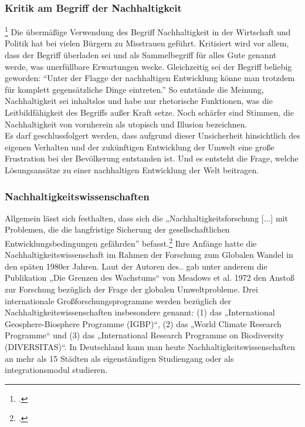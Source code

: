 \documentclass{scrartcl}
\begin{document}
\subsubsection{Kritik am Begriff der Nachhaltigkeit}\footcite{NachhaltigeBrockhaus.de}
Die übermäßige Verwendung des Begriff Nachhaltigkeit in der Wirtschaft und Politik hat bei vielen Bürgern zu Misstrauen geführt. Kritisiert wird vor allem, dass der Begriff überladen sei und als Sammelbegriff für alles Gute genannt werde, was unerfüllbare Erwartungen wecke. Gleichzeitig sei der Begriff beliebig geworden: “Unter der Flagge der nachhaltigen Entwicklung könne man trotzdem für komplett gegensätzliche Dinge eintreten.” So entstände die Meinung, Nachhaltigkeit sei inhaltslos und habe nur rhetorische Funktionen, was die Leitbildfähigkeit des Begriffs außer Kraft setze. Noch schärfer sind Stimmen, die Nachhaltigkeit von vornherein als utopisch und Illusion bezeichnen.
\\
Es darf geschlussfolgert werden, dass aufgrund dieser Unsicherheit hinsichtlich des eigenen Verhalten und der zukünftigen Entwicklung der Umwelt eine große Frustration bei der Bevölkerung entstanden ist. Und es entsteht die Frage, welche Lösungsansätze zu einer nachhaltigen Entwicklung der Welt beitragen.  


\subsubsection{Nachhaltigkeitswissenschaften}
Allgemein lässt sich festhalten, dass sich die „Nachhaltigkeitsforschung [...] mit Problemen, die die langfristige Sicherung der gesellschaftlichen Entwicklungsbedingungen gefährden” befasst.\footcite[S.126]{MichelsenGrundlagenEntwicklung}
Ihre Anfänge hatte die Nachhaltigkeitswissenschaft im Rahmen der Forschung zum Globalen Wandel in den späten 1980er Jahren. Laut der Autoren des..  gab unter anderem die Publikation „Die Grenzen des Wachstums“ von Meadows et al. 1972 den Anstoß zur Forschung bezüglich der Frage der globalen Umweltprobleme.
Drei internationale Großforschungsprogramme werden bezüglich der Nachhaltigkeitswissenschaften insbesondere genannt: (1) das „International Geosphere-Biosphere Programme (IGBP)“, (2) das „World Climate Research Programme“ und (3) das
„International Research Programme on Biodiversity (DIVERSITAS)“. In Deutschland kann man heute Nachhaltigkeitswissenschaften an mehr als 15 Städten als eigenständigen Studiengang oder als integrationsmodul studieren.
\end{document}
